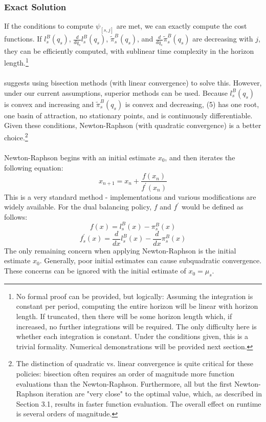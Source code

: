 \documentclass[12pt]{article}
\begin{document}
\subsubsection{Exact Solution}

If the conditions to compute $\psi_{[s, j]}$ are met, we can exactly compute the cost functions. If $l_s^B(q_s)$, $\frac{d}{d q_s} l_s^B(q_s)$, $\tilde{\pi}_s^B(q_s)$, and $\frac{d}{d q_s} \tilde{\pi}_s^B(q_s)$ are decreasing with $j$, they can be efficiently computed, with sublinear time complexity in the horizon length.\footnote{No formal proof can be provided, but logically: Assuming the integration is constant per period, computing the entire horizon will be linear with horizon length. If truncated, then there will be some horizon length which, if increased, no further integrations will be required. The only difficulty here is whether each integration is constant. Under the conditions given, this is a trivial formality. Numerical demonstrations will be provided next section.} \\
\\
\cite{levi:2007} suggests using bisection methods (with linear convergence) to solve this. However, under our current assumptions, superior methods can be used. Because $l_s^B(q_s)$ is convex and increasing and $\tilde{\pi}_s^B(q_s)$ is convex and decreasing, (5) has one root, one basin of attraction, no stationary points, and is continuously differentiable. Given these conditions, Newton-Raphson (with quadratic convergence) is a better choice.\footnote{The distinction of quadratic vs. linear convergence is quite critical for these policies: bisection often requires an order of magnitude more function evaluations than the Newton-Raphson. Furthermore, all but the first Newton-Raphson iteration are "very close" to the optimal value, which, as described in Section 3.1, results in faster function evaluation. The overall effect on runtime is several orders of magnitude.}\\
\\
Newton-Raphson begins with an initial estimate $x_0$, and then iterates the following equation:
$$
	x_{n+1} = x_n + \frac{f(x_n)}{f^{\prime}(x_n)}
$$
This is a very standard method - implementations and various modifications are widely available. For the dual balancing policy, $f$ and $f^{\prime}$ would be defined as follows:
$$
	f(x) = l_s^B(x) - \pi_s^B(x) 
$$
$$
	f_s^{\prime}(x) =  \frac{d}{dx} l_s^B(x) - \frac{d}{dx} \pi_s^B(x) 
$$
The only remaining concern when applying Newton-Raphson is the initial estimate $x_0$. Generally, poor initial estimates can cause subquadratic convergence. These concerns can be ignored with the initial estimate of $x_0 = \mu_s$.



\end{document}
